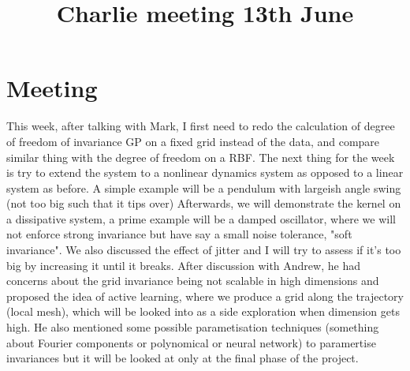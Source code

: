 \documentclass{article}
\title{\vspace{-3cm}Charlie meeting 13th June\vspace{-3em}}
\author{}
\date{}
\begin{document}
\maketitle
\section*{Meeting}
This week, after talking with Mark, I first need to redo the calculation of degree of freedom of invariance GP on a fixed grid instead of the data, and compare similar thing with the degree of freedom on a RBF.
The next thing for the week is try to extend the system to a nonlinear dynamics system as opposed to a linear system as before.
A simple example will be a pendulum with largeish angle swing (not too big such that it tips over)
Afterwards, we will demonstrate the kernel on a dissipative system, a prime example will be a damped oscillator, where we will not enforce strong invariance but have say a small noise tolerance, "soft invariance". 
We also discussed the effect of jitter and I will try to assess if it's too big by increasing it until it breaks.
After discussion with Andrew, he had concerns about the grid invariance being not scalable in high dimensions and proposed the idea of active learning, where we produce a grid along the trajectory (local mesh), which will be looked into as a side exploration when dimension gets high.
He also mentioned some possible parametisation techniques (something about Fourier components or polynomical or neural network) to paramertise invariances but it will be looked at only at the final phase of the project.
\end{document}
